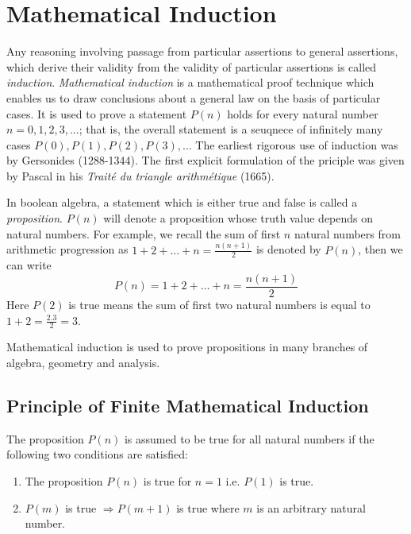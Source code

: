 \chapter{Mathematical Induction}
Any reasoning involving passage from particular assertions to general assertions, which derive their validity from the validity of
particular assertions is called \textit{induction}. \textit{Mathematical induction} is a mathematical proof technique which enables us to
draw conclusions about a general law on the basis of particular cases. It is used to prove a statement $P(n)$ holds for every
natural number $n = 0, 1, 2, 3, \ldots$; that is, the overall statement is a seuqnece of infinitely many cases $P(0), P(1), P(2),
P(3), \ldots$ The earliest rigorous use of induction was by Gersonides (1288-1344). The first explicit formulation of the priciple
was given by Pascal in his \textit{Traité du triangle arithmétique} (1665).

In boolean algebra, a statement which is either true and false is called a \textit{proposition}. $P(n)$ will denote a proposition
whose truth value depends on natural numbers. For example, we recall the sum of first $n$ natural numbers from arithmetic
progression as $1 + 2 + \ldots + n = \frac{n(n + 1)}{2}$ is denoted by $P(n)$, then we can write
$$P(n) = 1 + 2 + \ldots + n = \frac{n(n + 1)}{2}$$
Here $P(2)$ is true means the sum of first two natural numbers is equal to $1 + 2 = \frac{2.3}{2} = 3$.

Mathematical induction is used to prove propositions in many branches of algebra, geometry and analysis.

\section{Principle of Finite Mathematical Induction}
The proposition $P(n)$ is assumed to be true for all natural numbers if the following two conditions are satisfied:
\begin{enumerate}
\item The proposition $P(n)$ is true for $n = 1$ i.e. $P(1)$ is true.
\item $P(m)$ is true $\Rightarrow P(m + 1)$ is true where $m$ is an arbitrary natural number.
\end{enumerate}

